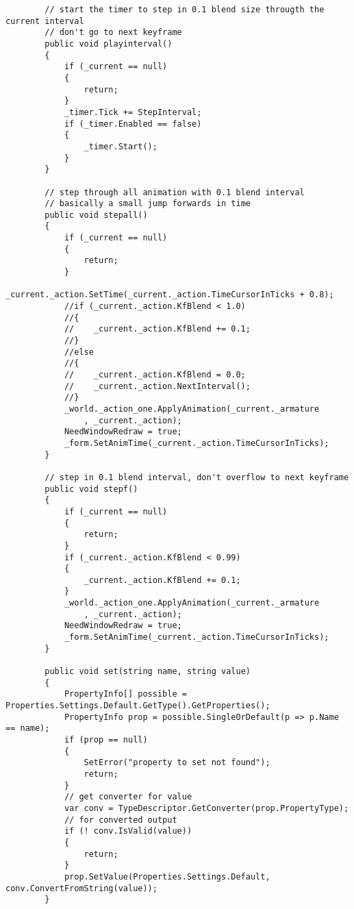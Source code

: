\begin{scriptsize}
\begin{verbatim}
        // start the timer to step in 0.1 blend size througth the current interval
        // don't go to next keyframe
        public void playinterval()
        {
            if (_current == null)
            {
                return;
            }
            _timer.Tick += StepInterval;
            if (_timer.Enabled == false)
            {
                _timer.Start();
            }
        }

        // step through all animation with 0.1 blend interval
        // basically a small jump forwards in time
        public void stepall()
        {
            if (_current == null)
            {
                return;
            }
            _current._action.SetTime(_current._action.TimeCursorInTicks + 0.8);
            //if (_current._action.KfBlend < 1.0)
            //{
            //    _current._action.KfBlend += 0.1;
            //}
            //else
            //{
            //    _current._action.KfBlend = 0.0;
            //    _current._action.NextInterval();
            //}
            _world._action_one.ApplyAnimation(_current._armature
                , _current._action);
            NeedWindowRedraw = true;
            _form.SetAnimTime(_current._action.TimeCursorInTicks);
        }

        // step in 0.1 blend interval, don't overflow to next keyframe
        public void stepf()
        {
            if (_current == null)
            {
                return;
            }
            if (_current._action.KfBlend < 0.99)
            {
                _current._action.KfBlend += 0.1;
            }
            _world._action_one.ApplyAnimation(_current._armature
                , _current._action);
            NeedWindowRedraw = true;
            _form.SetAnimTime(_current._action.TimeCursorInTicks);
        }

        public void set(string name, string value)
        {
            PropertyInfo[] possible = Properties.Settings.Default.GetType().GetProperties();
            PropertyInfo prop = possible.SingleOrDefault(p => p.Name == name);
            if (prop == null)
            {
                SetError("property to set not found");
                return;
            }
            // get converter for value
            var conv = TypeDescriptor.GetConverter(prop.PropertyType);
            // for converted output
            if (! conv.IsValid(value))
            {
                return;
            }
            prop.SetValue(Properties.Settings.Default, conv.ConvertFromString(value));
        }


\end{verbatim}
\end{scriptsize}
